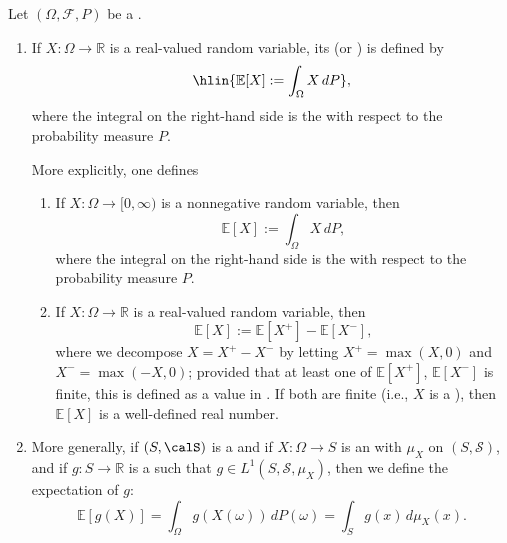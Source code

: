 \begin{definition} \label{definition:expectation_of_a_random_variable_on_a_probability_measure_space}
Let $(\Omega, \mathcal{F}, P)$ be a .

\begin{enumerate}
    \item If $X: \Omega \to \mathbb{R}$ is a real-valued random variable, 
    its  (or ) is defined by
    $$\hlin{\mathbb{E}[X] := \int_\Omega X\,dP},$$
    where the integral on the right-hand side is the  with respect to the probability measure $P$.

    More explicitly, one defines
    \begin{enumerate}
        \item If $X : \Omega \to [0, \infty)$ is a nonnegative random variable, then 
        $$\mathbb{E}[X] := \int_\Omega X\,dP,$$
        where the integral on the right-hand side is the  with respect to the probability measure $P$.

        \item If $X : \Omega \to \mathbb{R}$ is a real-valued random variable, then
        $$\mathbb{E}[X] := \mathbb{E}[X^+] - \mathbb{E}[X^-],$$
        where we decompose $X = X^+ - X^-$ by letting $X^+ = \max(X, 0)$ and $X^- = \max(-X, 0)$; provided that at least one of $\mathbb{E}[X^+]$, $\mathbb{E}[X^-]$ is finite, this is defined as a value in . If both are finite (i.e., $X$ is a ), then $\mathbb{E}[X]$ is a well-defined real number.
    \end{enumerate}

    \item More generally, if $(S,\calS)$ is a  and if $X : \Omega \to S$ is an  with  $\mu_X$ on $(S, \mathcal{S})$, and if $g : S \to \mathbb{R}$ is a  such that $g \in L^1(S, \mathcal{S}, \mu_X)$, then we define the expectation of $g$:
    $$\mathbb{E}[g(X)] = \int_\Omega g(X(\omega))\,dP(\omega) = \int_S g(x)\,d\mu_X(x).$$
\end{enumerate}


\end{definition}
